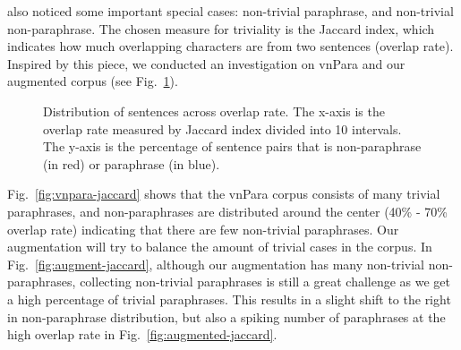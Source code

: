 \documentclass{llncs}
\begin{document}
\textcite{dinh2021} also noticed some important special cases: non-trivial paraphrase, and non-trivial non-paraphrase. The chosen measure for triviality is the Jaccard index, which indicates how much overlapping characters are from two sentences (overlap rate). Inspired by this piece, we conducted an investigation on vnPara and our augmented corpus (see Fig.~\ref{fig:jaccard}).

\begin{figure}[H]
    \centering
    \hfill
     \hfill
    \caption{Distribution of sentences across overlap rate. The x-axis is the overlap rate measured by Jaccard index divided into 10 intervals. The y-axis is the percentage of sentence pairs that is non-paraphrase (in red) or paraphrase (in blue).}
    \label{fig:jaccard}
\end{figure}

Fig.~\ref{fig:vnpara-jaccard} shows that the vnPara corpus consists of many trivial paraphrases, and non-paraphrases are distributed around the center (40\% - 70\% overlap rate) indicating that there are few non-trivial paraphrases. Our augmentation will try to balance the amount of trivial cases in the corpus. In Fig.~\ref{fig:augment-jaccard}, although our augmentation has many non-trivial non-paraphrases, collecting non-trivial paraphrases is still a great challenge as we get a high percentage of trivial paraphrases. This results in a slight shift to the right in non-paraphrase distribution, but also a spiking number of paraphrases at the high overlap rate in Fig.~\ref{fig:augmented-jaccard}.
\end{document}

